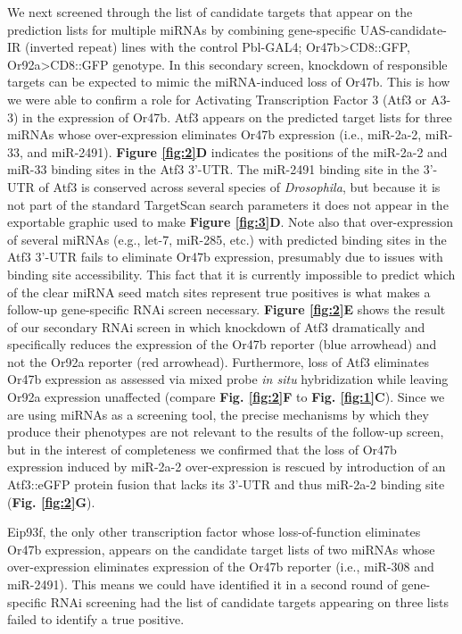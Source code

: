 We next screened through the list of candidate targets that appear on the prediction lists for multiple miRNAs by combining gene-specific UAS-candidate-IR (inverted repeat) lines with the control Pbl-GAL4; Or47b\textgreater{}CD8::GFP, Or92a\textgreater{}CD8::GFP genotype.
In this secondary screen, knockdown of responsible targets can be expected to mimic the miRNA-induced loss of Or47b.
This is how we were able to confirm a role for Activating Transcription Factor 3 (Atf3 or A3-3) in the expression of Or47b.
Atf3 appears on the predicted target lists for three miRNAs whose over-expression eliminates Or47b expression (i.e., miR-2a-2, miR-33, and miR-2491).
\textbf{Figure \ref{fig:2}D} indicates the positions of the miR-2a-2 and miR-33 binding sites in the Atf3 3'-UTR.
The miR-2491 binding site in the 3'-UTR of Atf3 is conserved across several species of \textit{Drosophila}, but because it is not part of the standard TargetScan search parameters it does not appear in the exportable graphic used to make \textbf{Figure \ref{fig:3}D}.
Note also that over-expression of several miRNAs (e.g., let-7, miR-285, etc.) with predicted binding sites in the Atf3 3'-UTR fails to eliminate Or47b expression, presumably due to issues with binding site accessibility.
This fact that it is currently impossible to predict which of the clear miRNA seed match sites represent true positives is what makes a follow-up gene-specific RNAi screen necessary.
\textbf{Figure \ref{fig:2}E} shows the result of our secondary RNAi screen in which knockdown of Atf3 dramatically and specifically reduces the expression of the Or47b reporter (blue arrowhead) and not the Or92a reporter (red arrowhead).
Furthermore, loss of Atf3 eliminates Or47b expression as assessed via mixed probe \textit{in situ} hybridization while leaving Or92a expression unaffected (compare \textbf{Fig. \ref{fig:2}F} to \textbf{Fig. \ref{fig:1}C}).
Since we are using miRNAs as a screening tool, the precise mechanisms by which they produce their phenotypes are not relevant to the results of the follow-up screen, but in the interest of completeness we confirmed that the loss of Or47b expression induced by miR-2a-2 over-expression is rescued by introduction of an Atf3::eGFP protein fusion that lacks its 3'-UTR and thus miR-2a-2 binding site (\textbf{Fig.
\ref{fig:2}G}).

Eip93f, the only other transcription factor whose loss-of-function eliminates Or47b expression, appears on the candidate target lists of two miRNAs whose over-expression eliminates expression of the Or47b reporter (i.e., miR-308 and miR-2491).
This means we could have identified it in a second round of gene-specific RNAi screening had the list of candidate targets appearing on three lists failed to identify a true positive.
  
  